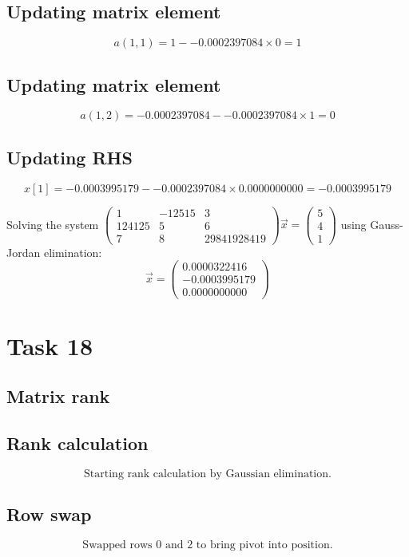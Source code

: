 \documentclass{article}
\begin{document}
\subsection*{ \vspace{1em} Updating matrix element}
\[
a(1,1 ) = 1 - -0.0002397084 \times 0 = 1
\]
\subsection*{ \vspace{1em} Updating matrix element}
\[
a(1,2 ) = -0.0002397084 - -0.0002397084 \times 1 = 0
\]
\subsection*{ \vspace{1em} Updating RHS}
\[
x[1] = -0.0003995179 - -0.0002397084 \times 0.0000000000 = -0.0003995179
\]
\medskip

Solving the system $\begin{pmatrix}1 & -12515 & 3 \\ 124125 & 5 & 6 \\ 7 & 8 & 29841928419\end{pmatrix}\vec{x} = \begin{pmatrix}5 \\ 4 \\ 1\end{pmatrix}$ using Gauss-Jordan elimination:
\[
\vec{x} = \begin{pmatrix}0.0000322416 \\ -0.0003995179 \\ 0.0000000000\end{pmatrix}
\]
\bigskip

\hrulefill
\bigskip

\section*{Task 18}

\subsection*{Matrix rank}
\subsection*{ \vspace{1em} Rank calculation}
\[
\text{Starting rank calculation by Gaussian elimination.}
\]
\subsection*{ \vspace{1em} Row swap}
\[
\text{Swapped rows } 0 \text{ and } 2 \text{ to bring pivot into position.}
\]
\end{document}

